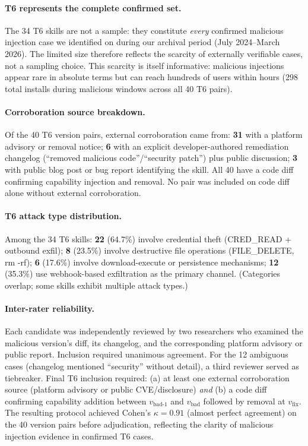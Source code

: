 \paragraph{T6 represents the complete confirmed set.}
The 34 T6 skills are not a sample: they constitute
\emph{every} confirmed malicious injection case we identified on \clawhub{}
during our archival period (July 2024--March 2026).
The limited size therefore reflects the scarcity of externally verifiable cases,
not a sampling choice. This scarcity is itself informative: malicious injections
appear rare in absolute terms but can reach hundreds of users within hours
(298 total installs during malicious windows across all 40 T6 pairs).

\paragraph{Corroboration source breakdown.}
Of the 40 T6 version pairs, external corroboration came from:
\textbf{31} with a \clawhub{} platform advisory or removal notice;
\textbf{6} with an explicit developer-authored remediation changelog
  (``removed malicious code''/``security patch'') plus public discussion;
\textbf{3} with public blog post or bug report identifying the skill.
All 40 have a code diff confirming capability injection and removal.
No pair was included on code diff alone without external corroboration.

\paragraph{T6 attack type distribution.}
Among the 34 T6 skills:
\textbf{22} (64.7\%) involve credential theft (CRED\_READ + outbound exfil);
\textbf{8} (23.5\%) involve destructive file operations (FILE\_DELETE, rm -rf);
\textbf{6} (17.6\%) involve download-execute or persistence mechanisms;
\textbf{12} (35.3\%) use webhook-based exfiltration as the primary channel.
(Categories overlap; some skills exhibit multiple attack types.)

\paragraph{Inter-rater reliability.}
Each candidate was independently reviewed by two researchers
who examined the malicious version's diff, its changelog,
and the corresponding platform advisory or public report.
Inclusion required unanimous agreement.
For the 12 ambiguous cases (changelog mentioned ``security'' without detail),
a third reviewer served as tiebreaker.
Final T6 inclusion required: (a) at least one external corroboration source
(platform advisory or public CVE/disclosure) \emph{and}
(b) a code diff confirming capability addition between $v_{\text{bad-1}}$
and $v_{\text{bad}}$ followed by removal at $v_{\text{fix}}$.
The resulting protocol achieved Cohen's $\kappa = 0.91$ (almost perfect agreement)
on the 40 version pairs before adjudication, reflecting the clarity of malicious
injection evidence in confirmed T6 cases.

